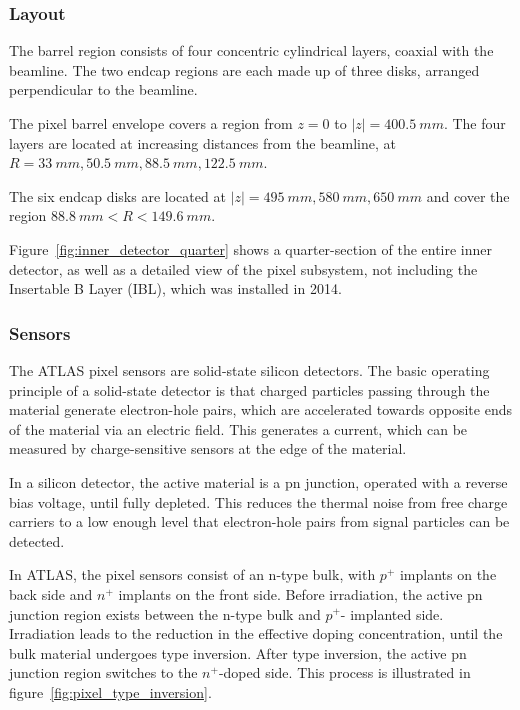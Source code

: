\subsubsection{Layout}
The barrel region consists of four concentric cylindrical layers, coaxial with the beamline.
The two endcap regions are each made up of three disks, arranged perpendicular to the beamline.

The pixel barrel envelope covers a region from $z = 0$ to $|z|  = 400.5~mm$.
The four layers are located at increasing distances from the beamline, at $R = 33~mm, 50.5~mm, 88.5~mm, 122.5~mm$.

The six endcap disks are located at $|z| = 495~mm, 580~mm, 650~mm$ and cover the region $88.8~mm < R < 149.6~mm$.\cite{atlas-detector-2008}

Figure~\ref{fig:inner_detector_quarter} shows a quarter-section of
the entire inner detector, as well as a detailed view of the pixel
subsystem, not including the Insertable B Layer (IBL), which was
installed in 2014.

\subsubsection{Sensors}
The ATLAS pixel sensors are solid-state silicon detectors.
The basic operating principle of a solid-state detector is that charged particles passing through the material
generate electron-hole pairs, which are accelerated towards opposite ends of the material via an electric field.
This generates a current, which can be measured by charge-sensitive sensors at the edge of the material.\cite{spieler-2005}

In a silicon detector, the active material is a pn junction, operated with a reverse bias voltage,
until fully depleted.
This reduces the thermal noise from free charge carriers to a low enough level that electron-hole pairs
from signal particles can be detected.\cite{spieler-2005}

In ATLAS, the pixel sensors consist of an n-type bulk, with $p^+$ implants on the back side and $n^+$ implants on the front side.
Before irradiation, the active pn junction region exists between the n-type bulk and $p^+$- implanted side.
Irradiation leads to the reduction in the effective doping concentration,
until the bulk material undergoes type inversion.
After type inversion, the active pn junction region switches to the $n^+$-doped side.\cite{pixels-2008}
This process is illustrated in figure~\ref{fig:pixel_type_inversion}.

